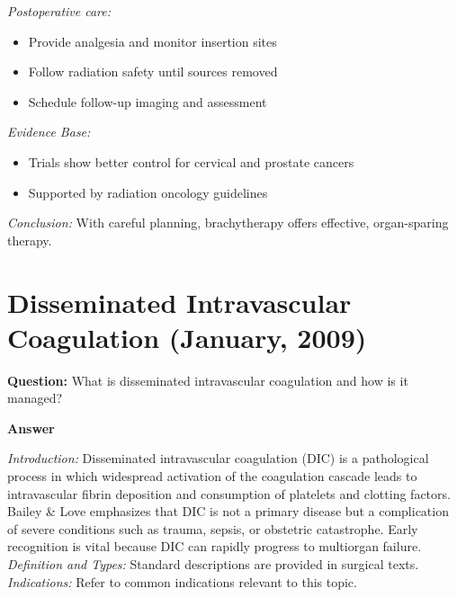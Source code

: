 \documentclass{article}
\begin{document}
\emph{Postoperative care:}
\begin{itemize}
\item Provide analgesia and monitor insertion sites
\item Follow radiation safety until sources removed
\item Schedule follow-up imaging and assessment
\end{itemize}
\emph{Evidence Base:}
\begin{itemize}
\item Trials show better control for cervical and prostate cancers
\item Supported by radiation oncology guidelines
\end{itemize}
\emph{Conclusion:} With careful planning, brachytherapy offers effective, organ-sparing therapy.

\section{Disseminated Intravascular Coagulation (January, 2009)}

\textbf{Question:} What is disseminated intravascular coagulation and how is it managed?

\textbf{Answer}

\emph{Introduction:} Disseminated intravascular coagulation (DIC) is a pathological process in which widespread activation of the coagulation cascade leads to intravascular fibrin deposition and consumption of platelets and clotting factors. Bailey & Love emphasizes that DIC is not a primary disease but a complication of severe conditions such as trauma, sepsis, or obstetric catastrophe. Early recognition is vital because DIC can rapidly progress to multiorgan failure.
\emph{Definition and Types:} Standard descriptions are provided in surgical texts.
\emph{Indications:} Refer to common indications relevant to this topic.
\end{document}
